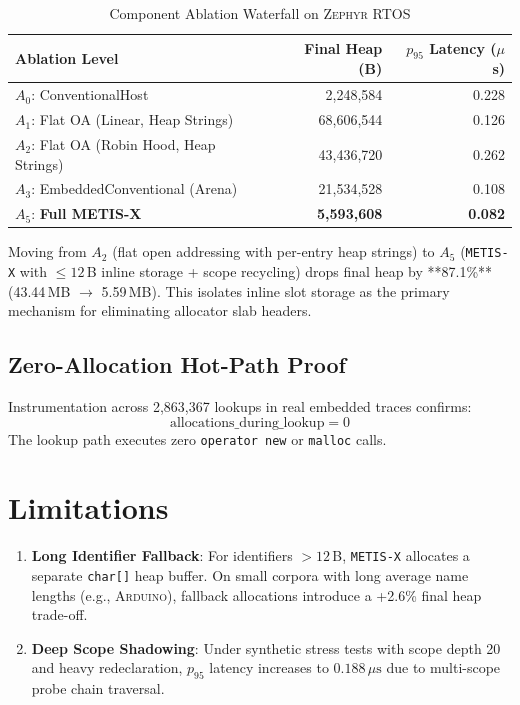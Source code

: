 \documentclass[conference]{IEEEtran}
\begin{document}
\begin{table}[h]
\centering
\caption{Component Ablation Waterfall on \textsc{Zephyr} RTOS}
\label{tab:ablation}
\begin{tabular}{lrr}
\toprule
\textbf{Ablation Level} & \textbf{Final Heap (B)} & \textbf{$p_{95}$ Latency ($\mu$s)} \\
\midrule
$A_0$: ConventionalHost & 2,248,584 & 0.228 \\
$A_1$: Flat OA (Linear, Heap Strings) & 68,606,544 & 0.126 \\
$A_2$: Flat OA (Robin Hood, Heap Strings) & 43,436,720 & 0.262 \\
$A_3$: EmbeddedConventional (Arena) & 21,534,528 & 0.108 \\
$A_5$: \textbf{Full METIS-X} & \textbf{5,593,608} & \textbf{0.082} \\
\bottomrule
\end{tabular}
\end{table}

Moving from $A_2$ (flat open addressing with per-entry heap strings) to $A_5$ (\texttt{METIS-X} with $\le 12$\,B inline storage + scope recycling) drops final heap by **87.1\%** (43.44\,MB $\to$ 5.59\,MB). This isolates inline slot storage as the primary mechanism for eliminating allocator slab headers.

\subsection{Zero-Allocation Hot-Path Proof}
Instrumentation across 2,863,367 lookups in real embedded traces confirms:
\begin{equation}
\text{allocations\_during\_lookup} = 0
\end{equation}
The lookup path executes zero \texttt{operator new} or \texttt{malloc} calls.

\section{Limitations}
\begin{enumerate}
    \item \textbf{Long Identifier Fallback}: For identifiers $>12$\,B, \texttt{METIS-X} allocates a separate \texttt{char[]} heap buffer. On small corpora with long average name lengths (e.g., \textsc{Arduino}), fallback allocations introduce a +2.6\% final heap trade-off.
    \item \textbf{Deep Scope Shadowing}: Under synthetic stress tests with scope depth 20 and heavy redeclaration, $p_{95}$ latency increases to $0.188\,\mu\text{s}$ due to multi-scope probe chain traversal.
\end{enumerate}
\end{document}
